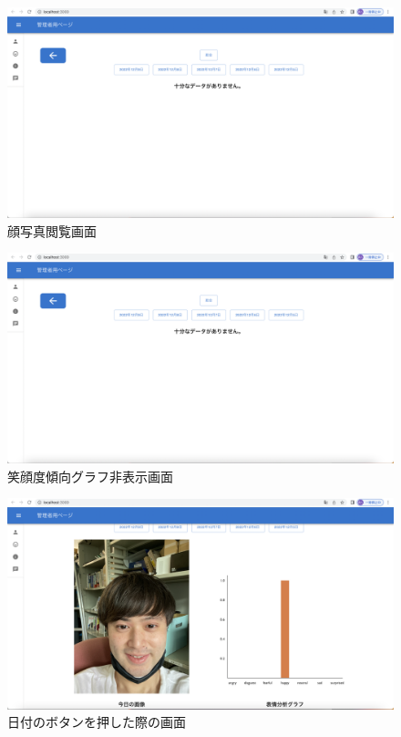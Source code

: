 \begin{figure}[!h]
	\begin{center}
			\includegraphics[scale=0.3, clip]{./img/sample9.png}
			\caption{顔写真閲覧画面}
			\label{fig:図の名前}
	\end{center}
\end{figure}

\begin{figure}[!h]
	\begin{center}
			\includegraphics[scale=0.3, clip]{./img/sample9.png}
			\caption{笑顔度傾向グラフ非表示画面}
			\label{fig:図の名前}
	\end{center}
\end{figure}

\clearpage

\begin{figure}[!h]
	\begin{center}
			\includegraphics[scale=0.3, clip]{./img/sample10.png}
			\caption{日付のボタンを押した際の画面}
			\label{fig:図の名前}
	\end{center}
\end{figure}

